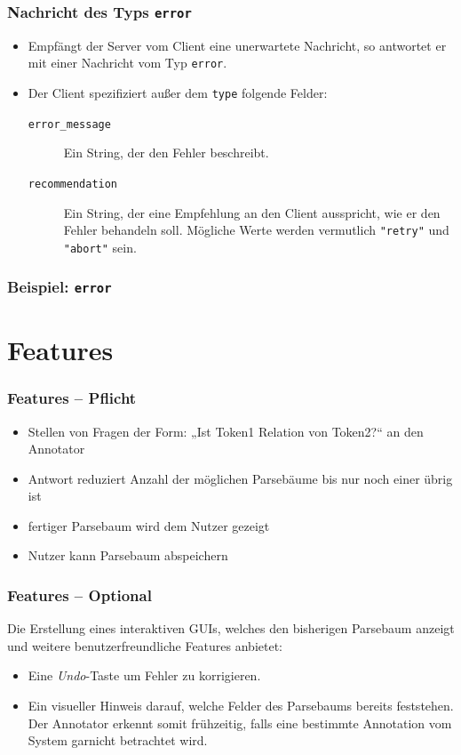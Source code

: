 \documentclass{beamer} %
\begin{document}
\begin{frame}
    \frametitle{Nachricht des Typs \texttt{error}}
    \begin{itemize}
        \item Empfängt der Server vom Client eine unerwartete Nachricht, so antwortet er mit einer Nachricht vom Typ \texttt{error}.
        \item Der Client spezifiziert außer dem \texttt{type} folgende Felder:
            \begin{description}
                \item[\texttt{error\_message}] Ein String, der den Fehler beschreibt.
                \item[\texttt{recommendation}] Ein String, der eine Empfehlung an den Client ausspricht, wie er den Fehler behandeln soll.
                    Mögliche Werte werden vermutlich \texttt{"retry"} und \texttt{"abort"} sein.
            \end{description}
    \end{itemize}
\end{frame}

\begin{frame}
    \frametitle{Beispiel: \texttt{error}}
    
\end{frame}

\section{Features}

\begin{frame}
    \frametitle{Features – Pflicht}
    \begin{itemize}
        \item  Stellen von Fragen  der Form: „Ist Token1 Relation von Token2?“ an den Annotator
        \item Antwort reduziert Anzahl der möglichen Parsebäume bis nur noch einer übrig ist
        \item fertiger Parsebaum wird dem Nutzer gezeigt
        \item Nutzer kann Parsebaum abspeichern
    \end{itemize}
\end{frame}

\begin{frame}
    \frametitle{Features – Optional}
    Die Erstellung eines interaktiven GUIs, welches den bisherigen Parsebaum anzeigt und weitere benutzerfreundliche Features anbietet:
    \begin{itemize}
        \item Eine \emph{Undo}-Taste um Fehler zu korrigieren.
        \item Ein visueller Hinweis darauf, welche Felder des Parsebaums bereits feststehen. Der Annotator erkennt somit frühzeitig, falls eine bestimmte Annotation vom System garnicht betrachtet wird.
    \end{itemize}
\end{frame}
\end{document}
